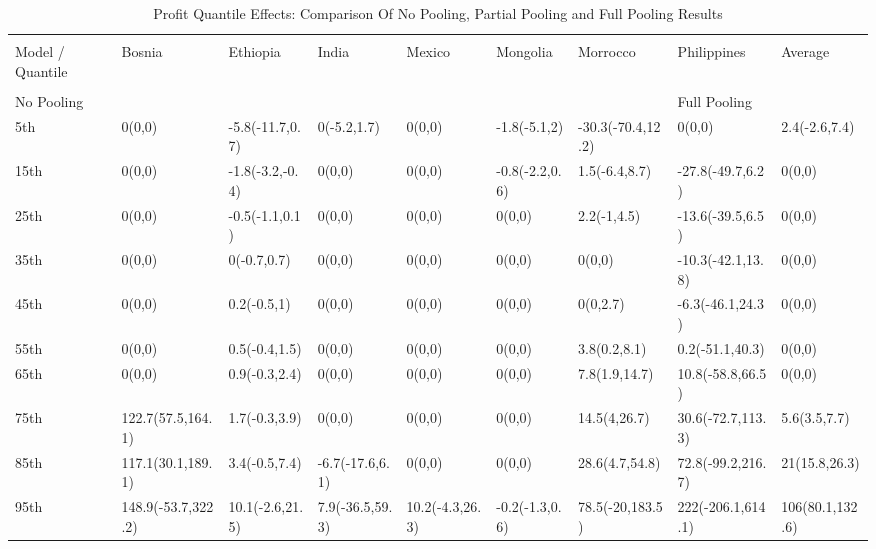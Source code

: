 \documentclass[AER]{AEA}
\begin{document}
\clearpage
\newpage
\singlespacing

\begin{table}[!htbp] \centering
  \caption{Profit Quantile Effects: Comparison Of No Pooling, Partial Pooling and Full Pooling Results}
  \label{big profit table}
  \tiny
\begin{tabular}{@{\extracolsep{0pt}} lllllllll} 
\\[-1.8ex]\hline 
\hline \\[-1.8ex] 
  Model / Quantile & Bosnia & Ethiopia & India & Mexico & Mongolia & Morrocco & Philippines & Average \\ 
\hline \\[-1.8ex] 
No Pooling & & & & & & & Full Pooling \\
 5th & 0(0,0) & -5.8(-11.7,0.7) & 0(-5.2,1.7) & 0(0,0) & -1.8(-5.1,2) & -30.3(-70.4,12.2) & 0(0,0) & 2.4(-2.6,7.4) \\ 
15th & 0(0,0) & -1.8(-3.2,-0.4) & 0(0,0) & 0(0,0) & -0.8(-2.2,0.6) & 1.5(-6.4,8.7) & -27.8(-49.7,6.2) & 0(0,0) \\ 
25th & 0(0,0) & -0.5(-1.1,0.1) & 0(0,0) & 0(0,0) & 0(0,0) & 2.2(-1,4.5) & -13.6(-39.5,6.5) & 0(0,0) \\ 
 35th & 0(0,0) & 0(-0.7,0.7) & 0(0,0) & 0(0,0) & 0(0,0) & 0(0,0) & -10.3(-42.1,13.8) & 0(0,0) \\ 
 45th & 0(0,0) & 0.2(-0.5,1) & 0(0,0) & 0(0,0) & 0(0,0) & 0(0,2.7) & -6.3(-46.1,24.3) & 0(0,0) \\ 
55th & 0(0,0) & 0.5(-0.4,1.5) & 0(0,0) & 0(0,0) & 0(0,0) & 3.8(0.2,8.1) & 0.2(-51.1,40.3) & 0(0,0) \\ 
65th & 0(0,0) & 0.9(-0.3,2.4) & 0(0,0) & 0(0,0) & 0(0,0) & 7.8(1.9,14.7) & 10.8(-58.8,66.5) & 0(0,0) \\ 
75th & 122.7(57.5,164.1) & 1.7(-0.3,3.9) & 0(0,0) & 0(0,0) & 0(0,0) & 14.5(4,26.7) & 30.6(-72.7,113.3) & 5.6(3.5,7.7) \\ 
85th & 117.1(30.1,189.1) & 3.4(-0.5,7.4) & -6.7(-17.6,6.1) & 0(0,0) & 0(0,0) & 28.6(4.7,54.8) & 72.8(-99.2,216.7) & 21(15.8,26.3) \\ 
95th & 148.9(-53.7,322.2) & 10.1(-2.6,21.5) & 7.9(-36.5,59.3) & 10.2(-4.3,26.3) & -0.2(-1.3,0.6) & 78.5(-20,183.5) & 222(-206.1,614.1) & 106(80.1,132.6) \\ 


\end{tabular}
\end{table}
\end{document}
